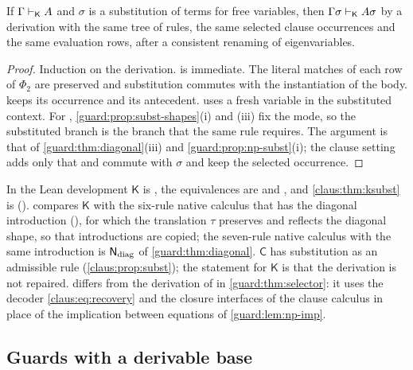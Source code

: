 \begin{theorem}
\label{claus:thm:ksubst}
If $\Gamma\vdash_{\mathsf{K}}A$ and $\sigma$ is a substitution of terms
for free variables, then $\Gamma\sigma\vdash_{\mathsf{K}}A\sigma$ by a
derivation with the same tree of rules, the same selected clause
occurrences and the same evaluation rows, after a consistent renaming of
eigenvariables.
\end{theorem}
\begin{proof}
Induction on the derivation.  is immediate. The literal
matches of each row of $\Phi_2$ are preserved and substitution commutes with
the instantiation of the body.  keeps its occurrence and its
antecedent.  uses a fresh variable in the substituted
context. For , \cref{guard:prop:subst-shapes}(i) and (iii)
fix the mode, so the substituted branch is the branch that the same rule
requires. The argument is that of \cref{guard:thm:diagonal}(iii) and
\cref{guard:prop:np-subst}(i); the clause setting adds only that
 and  commute with $\sigma$ and keep the
selected occurrence.
\end{proof}

\begin{remark}
\label{claus:rem:kpkgs}
In the Lean development $\mathsf{K}$ is , the equivalences are
 and , and
\cref{claus:thm:ksubst} is 
().  compares $\mathsf{K}$
with the six-rule native calculus that has the diagonal introduction
(), for which the translation $\tau$ preserves and reflects the
diagonal shape, so that introductions are copied; the seven-rule native
calculus with the same introduction is $\mathsf{N}_{\mathrm{diag}}$ of
\cref{guard:thm:diagonal}. $\mathsf{C}$ has
substitution as an admissible rule (\cref{claus:prop:subst}); the
statement for $\mathsf{K}$ is that the derivation is not repaired.
 differs from the derivation of  in
\cref{guard:thm:selector}: it uses the decoder \eqref{claus:eq:recovery}
and the closure interfaces of the clause calculus in place of the
implication between equations of \cref{guard:lem:np-imp}.
\end{remark}

\subsection{Guards with a derivable base}
\label{claus:sec:guards}

